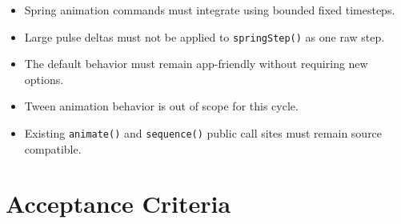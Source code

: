\begin{itemize}
\tightlist
\item
  Spring animation commands must integrate using bounded fixed timesteps.
\item
  Large pulse deltas must not be applied to \texttt{s\allowbreak{}p\allowbreak{}r\allowbreak{}i\allowbreak{}n\allowbreak{}g\allowbreak{}S\allowbreak{}t\allowbreak{}e\allowbreak{}p\allowbreak{}(\allowbreak{})} as one raw step.
\item
  The default behavior must remain app-friendly without requiring new options.
\item
  Tween animation behavior is out of scope for this cycle.
\item
  Existing \texttt{a\allowbreak{}n\allowbreak{}i\allowbreak{}m\allowbreak{}a\allowbreak{}t\allowbreak{}e\allowbreak{}(\allowbreak{})} and \texttt{s\allowbreak{}e\allowbreak{}q\allowbreak{}u\allowbreak{}e\allowbreak{}n\allowbreak{}c\allowbreak{}e\allowbreak{}(\allowbreak{})} public call sites must remain source compatible.
\end{itemize}

\section{Acceptance Criteria}\label{record-161-acceptance-criteria}

